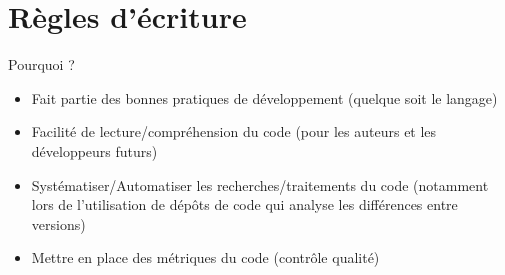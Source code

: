 
\section{Règles d’écriture}

\begin{frame}{Pourquoi ?}
	\begin{itemize}
		\item Fait partie des bonnes pratiques de développement (quelque soit le langage)
		\item Facilité de lecture/compréhension du code (pour les auteurs et les développeurs futurs)
		\item Systématiser/Automatiser les recherches/traitements du code (notamment lors de l’utilisation de dépôts de code qui analyse les différences entre versions)
		\item Mettre en place des métriques du code (contrôle qualité)
	\end{itemize}
\end{frame}

